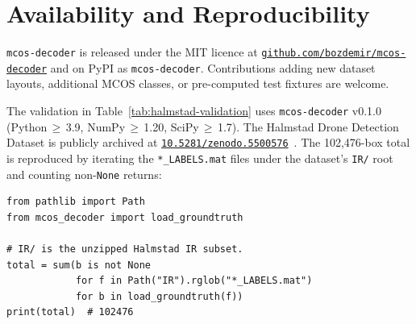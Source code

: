\documentclass{article}
\begin{document}
\section{Availability and Reproducibility}

\texttt{mcos-decoder} is released under the MIT licence at
\href{https://github.com/bozdemir/mcos-decoder}{\texttt{github.com/bozdemir/mcos-decoder}}
and on PyPI as \texttt{mcos-decoder}. Contributions adding new dataset
layouts, additional MCOS classes, or pre-computed test fixtures are
welcome.

The validation in Table~\ref{tab:halmstad-validation} uses
\texttt{mcos-decoder} v0.1.0 (Python\,$\geq$\,3.9, NumPy\,$\geq$\,1.20,
SciPy\,$\geq$\,1.7). The Halmstad Drone Detection Dataset is publicly
archived at \href{https://doi.org/10.5281/zenodo.5500576}%
{\texttt{10.5281/zenodo.5500576}}~\cite{halmstadzenodo}. The
102{,}476-box total is reproduced by iterating the
\texttt{*\_LABELS.mat} files under the dataset's \texttt{IR/} root and
counting non-\texttt{None} returns:

\begin{lstlisting}
from pathlib import Path
from mcos_decoder import load_groundtruth

# IR/ is the unzipped Halmstad IR subset.
total = sum(b is not None
            for f in Path("IR").rglob("*_LABELS.mat")
            for b in load_groundtruth(f))
print(total)  # 102476
\end{lstlisting}
\end{document}
